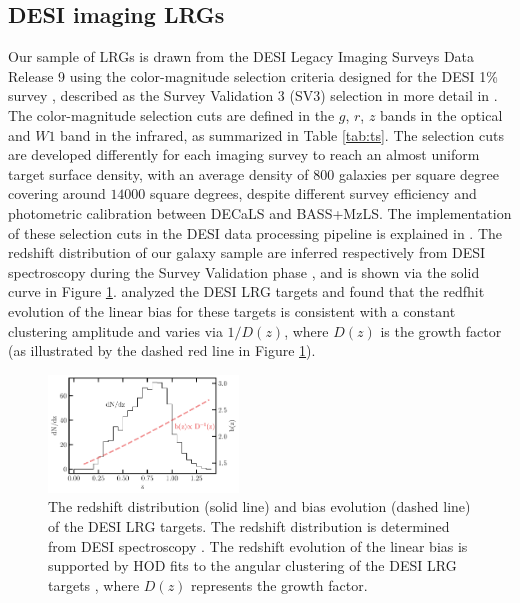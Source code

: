 \subsection{DESI imaging LRGs}
Our sample of LRGs is drawn from the DESI Legacy Imaging Surveys Data Release 9 \citep[DR9;][]{dey2018overview} using the color-magnitude selection criteria designed for the DESI 1\% survey \citep{desi2023sv}, described as the Survey Validation 3 (SV3) selection in more detail in \cite{zhou2022target}. The color-magnitude selection cuts are defined in the $g$, $r$, $z$ bands in the optical and $W1$ band in the infrared, as summarized in Table \ref{tab:ts}. The selection cuts are developed differently for each imaging survey to reach an almost uniform target surface density, with an average density of $800$ galaxies per square degree covering around $14000$ square degrees, despite different survey efficiency and photometric calibration between DECaLS and BASS+MzLS. The implementation of these selection cuts in the DESI data processing pipeline is explained in \cite{myers2022}. The redshift distribution of our galaxy sample are inferred respectively from DESI spectroscopy during the Survey Validation phase \citep{desi2023sv}, and is shown via the solid curve in Figure \ref{fig:nz}. \cite{zhou2021clustering} analyzed the DESI LRG targets and found that the redfhit evolution of the linear bias for these targets is consistent with a constant clustering amplitude and varies via $1/D(z)$, where $D(z)$ is the growth factor (as illustrated by the dashed red line in Figure \ref{fig:nz}). 

\begin{figure}
 \centering
 \includegraphics[width=0.45\textwidth]{figures/nz_lrg.pdf}
 \caption{The redshift distribution (solid line) and bias evolution (dashed line) of the DESI LRG targets. The redshift distribution is determined from DESI spectroscopy \citep{desi2023sv}. The redshift evolution of the linear bias is supported by HOD fits to the angular clustering of the DESI LRG targets \citep{zhou2021clustering}, where $D(z)$ represents the growth factor.}
 \label{fig:nz}
\end{figure}

